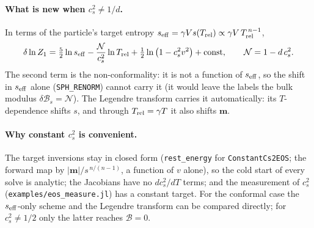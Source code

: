 \documentclass[11pt,aps,preprint,nofootinbib,superscriptaddress,tightenlines]{revtex4-2}
\def\st{\begin{equation}}
\def\stp{\end{equation}}
\let\oldparagraph\paragraph
\renewcommand{\paragraph}{\par\bigskip\oldparagraph}
\begin{document}
\paragraph{What is new when $c_s^2\neq1/d$.}  In terms of the particle's target entropy $s_{\rm eff}=\gamma Vs(T_{\rm rel})\propto\gamma V\,T_{\rm rel}^{\,n-1}$,
\st
\delta\ln Z_1=\tfrac52\ln s_{\rm eff}-\frac{\mathcal N}{c_s^2}\ln T_{\rm rel}+\tfrac12\ln\big(1-c_s^2v^2\big)+{\rm const},\qquad \mathcal N=1-d\,c_s^2 .
\stp
The second term is the non-conformality: it is not a function of $s_{\rm eff}$, so the shift in $s_{\rm eff}$ alone (\texttt{SPH\_RENORM}) cannot carry it (it would leave the labels the
bulk modulus $\delta\mathcal B_s=\mathcal N$).  The Legendre transform carries it automatically: its $T$-dependence shifts $s$, and through $T_{\rm rel}=\gamma T$ it also shifts $\bm m$.

\paragraph{Why constant $c_s^2$ is convenient.}  The target inversions stay in closed form (\texttt{rest\_energy} for \texttt{ConstantCs2EOS}; the forward map by
$|\bm m|/s^{\,n/(n-1)}$, a function of $v$ alone), so the cold start of every solve is analytic; the Jacobians have no $dc_s^2/dT$ terms; and the measurement of
$c_s^2$ (\nolinkurl{examples/eos_measure.jl}) has a constant target.  For the conformal case the $s_{\rm eff}$-only scheme and the Legendre transform can be compared
directly; for $c_s^2\neq1/2$ only the latter reaches $\mathcal B=0$.
\end{document}
